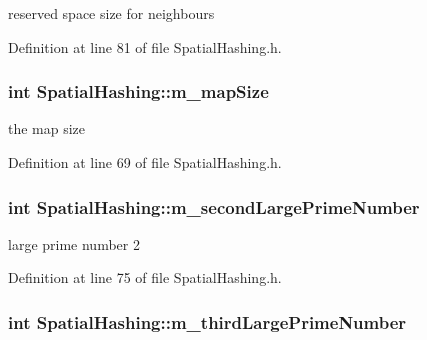 reserved space size for neighbours 



Definition at line 81 of file SpatialHashing.h.

\hypertarget{class_spatial_hashing_a3062fc7637f6ba8aca2d4b74a3f96b9b}{
\subsubsection[{m\_\-mapSize}]{\setlength{\rightskip}{0pt plus 5cm}int {\bf SpatialHashing::m\_\-mapSize}}}
\label{class_spatial_hashing_a3062fc7637f6ba8aca2d4b74a3f96b9b}


the map size 



Definition at line 69 of file SpatialHashing.h.

\hypertarget{class_spatial_hashing_a80745b4791c3f19b1c2170c18b0832ac}{
\subsubsection[{m\_\-secondLargePrimeNumber}]{\setlength{\rightskip}{0pt plus 5cm}int {\bf SpatialHashing::m\_\-secondLargePrimeNumber}}}
\label{class_spatial_hashing_a80745b4791c3f19b1c2170c18b0832ac}


large prime number 2 



Definition at line 75 of file SpatialHashing.h.

\hypertarget{class_spatial_hashing_a705bb42422d5edd7d8605f95618760c1}{
\subsubsection[{m\_\-thirdLargePrimeNumber}]{\setlength{\rightskip}{0pt plus 5cm}int {\bf SpatialHashing::m\_\-thirdLargePrimeNumber}}}
\label{class_spatial_hashing_a705bb42422d5edd7d8605f95618760c1}


